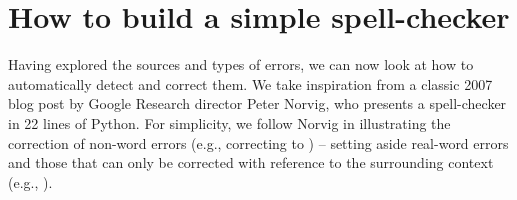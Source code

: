 \section{How to build a simple spell-checker}


Having explored the sources and types of errors, we can now look at how to
automatically detect and correct them.  We take inspiration from a classic 2007 blog post \citep{Norvig:2007} by Google Research director Peter Norvig, who presents a spell-checker in 22 lines of Python.   For simplicity, we follow Norvig in illustrating the  correction of non-word errors (e.g., correcting  to ) -- setting aside real-word errors and those that can only be corrected with reference to the surrounding context (e.g., ).



